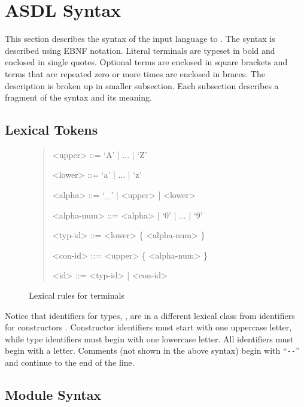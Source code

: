 %
\chapter{ASDL Syntax}
\label{chap:syntax}

This section describes the syntax of the input language to \asdlgen{}.
The syntax is described using EBNF notation.
Literal terminals are typeset in bold and enclosed in single quotes.
Optional terms are enclosed in square brackets and terms that are
repeated zero or more times are enclosed in braces.
The description is broken up in smaller subsection.
Each subsection describes a fragment of
the syntax and its meaning.

\section{Lexical Tokens}

\begin{figure}[t]
  \begin{quote}
    \begin{grammar}
      <upper>     ::= `A' | ... | `Z'

      <lower>     ::= `a' | ... | `z'

      <alpha>     ::= `_' | <upper> | <lower>

      <alpha-num> ::= <alpha> | `0' | ... | `9'

      <typ-id>    ::= <lower> \{ <alpha-num> \}

      <con-id>    ::= <upper> \{ <alpha-num> \}

      <id>        ::= <typ-id> | <con-id>
    \end{grammar}
  \end{quote}
  \caption{Lexical rules for \asdl{} terminals}
  \label{fig:lexical-syntax}
\end{figure}%

Notice that identifiers for types, , are in a different
lexical class from identifiers for constructors
. Constructor identifiers must start with one uppercase
letter, while type identifiers must begin with one lowercase
letter. All identifiers must begin with a letter.  Comments (not shown
in the above syntax) begin with ``\lstinline[language=ASDL]!--!''
and continue to the end of the line.

\section{Module Syntax}

